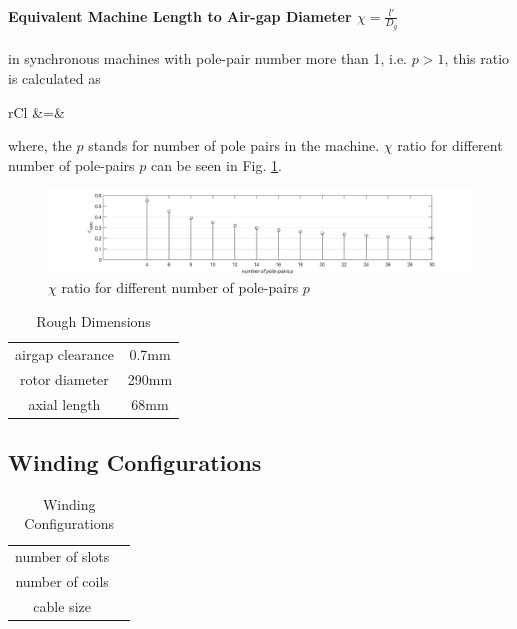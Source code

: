 \documentclass [a4 paper, 11pt, titlepage] {article}
\begin{document}
	\paragraph{Equivalent Machine Length to Air-gap Diameter $\chi=\frac{l'}{D_g}$} in synchronous machines with pole-pair number more than 1, i.e. $p>1$, this ratio is calculated as
	\begin{IEEEeqnarray*}{rCl}
		\chi &=& \approx{} \\
	\end{IEEEeqnarray*}
	where, the $p$ stands for number of pole pairs in the machine. $\chi$ ratio for different number of pole-pairs $p$ can be seen in Fig. \ref{fig:chiRatio}.
	\begin{figure}[h]
		\includegraphics[width=\textwidth]{chiRatio.png}
		\caption{$\chi$ ratio for different number of pole-pairs $p$}
		\label{fig:chiRatio}
	\end{figure}

	
	\begin{table}[h]
		\begin{center}
			\begin{tabular}{c|c}
				 &  \\
				\hline
				airgap clearance & 0.7mm\\
				rotor diameter & 290mm\\
				axial length & 68mm 
			\end{tabular}
		\end{center}
		\caption{Rough Dimensions}
		\label{tab:roughDimensions}
	\end{table}
	
	
	
	
	\subsection{Winding Configurations}
		\begin{table}[h]
		\begin{center}
			\begin{tabular}{c|c}
				 &  \\
				\hline
				number of slots & \\
				number of coils & \\
				cable size & 
			\end{tabular}
		\end{center}
		\caption{Winding Configurations}
		\label{tab:windingConfigurations}
	\end{table}
	
\end{document}
